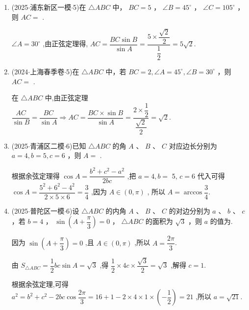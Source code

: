 \begin{enumerate}
    \item (2025$\cdot$浦东新区一模$\cdot$5)在 $\bigtriangleup  {ABC}$ 中， ${BC} = 5$ ， $\angle B = {45}^{ \circ  }$ ， $\angle C = {105}^{ \circ  }$ ，则 ${AC} =$ .
    \begin{jieda}
        $\angle A =  {30}^{ \circ  }$ ,由正弦定理得, ${AC} = \dfrac{{BC}\sin B}{\sin A} = \dfrac{5 \times  \dfrac{\sqrt{2}}{2}}{\dfrac{1}{2}} = 5\sqrt{2}$.
    \end{jieda}

    \item (2024$\cdot$上海春季卷$\cdot$5)在 $\bigtriangleup  {ABC}$ 中，若 ${BC} = 2,\angle A = {45}^{ \circ  },\angle B = {30}^{ \circ  }$ ，则 ${AC} =$ .
    \begin{jieda}
        在 $\bigtriangleup {ABC}$ 中,由正弦定理 $\dfrac{AC}{\sin B} = \dfrac{BC}{\sin A} \Longrightarrow  {AC} =  \dfrac{{BC} \times  \sin B}{\sin A} = \dfrac{2 \times  \dfrac{1}{2}}{\dfrac{\sqrt{2}}{2}} = \sqrt{2}.$
    \end{jieda}

    \item (2025$\cdot$青浦区二模$\cdot$6)已知 $\bigtriangleup  {ABC}$ 的角 $A$ 、 $B$ 、 $C$ 对应边长分别为 $a = 4,b = 5,c = 6$ ，则 $A =$ .
    \begin{jieda}
        根据余弦定理得 $\cos A = \dfrac{{b}^{2} + {c}^{2} - {a}^{2}}{2bc}$ ,把 $a = 4,b =$ 5, $c = 6$ 代入可得 $\cos A = \dfrac{{5}^{2} + {6}^{2} - {4}^{2}}{2 \times  5 \times  6} = \dfrac{3}{4}$ ,因为 $A \in  \left( {0,\pi }\right)$ , 所以 $A = \arccos \dfrac{3}{4}$.
    \end{jieda}

    \item (2025$\cdot$普陀区一模$\cdot$6)设 $\bigtriangleup  {ABC}$ 的内角 $A$ 、 $B$ 、 $C$ 的对边分别为 $a$ 、 $b$ 、 $c$ ，若 $b = 4$ ， $\sin \left( {A + \dfrac{\pi }{3}}\right)  = 0$ ， $\bigtriangleup {ABC}$ 的面积为 $\sqrt{3}$ ，则 $a$ 的值为.
    \begin{jieda}
        因为 $\sin \left( {A + \dfrac{\pi }{3}}\right)  = 0$ ,且 $A \in  \left( {0,\pi }\right)$ ,所以 $A = \dfrac{2\pi }{3}$. 
        
        由 ${S}_{\bigtriangleup {ABC}} = \dfrac{1}{2}{bc}\sin A = \sqrt{3}$ ,得 $\dfrac{1}{2} \times  {4c} \times  \dfrac{\sqrt{3}}{2} = \sqrt{3}$ ,解得 $c = 1$. 
        
        根据余弦定理,可得 ${a}^{2} = {b}^{2} + {c}^{2} - {2bc}\cos \dfrac{2\pi }{3} = {16} + 1 - 2 \times  4 \times  1 \times  \left( {-\dfrac{1}{2}}\right)  = {21}$ ,所以 $a = \sqrt{21}$.
    \end{jieda}


\end{enumerate}
